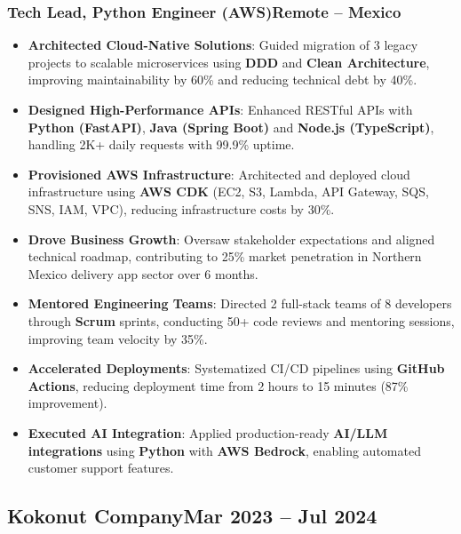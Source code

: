 \documentclass[a4paper,10pt]{article}
\newcommand{\kw}[1]{\textbf{\textcolor{keyword}{#1}}}
\newcommand{\tech}[1]{\textbf{\textcolor{tech}{#1}}}
\begin{document}
\subsubsection*{\small Tech Lead, Python Engineer (AWS)\hfill Remote -- Mexico}
\begin{itemize}[noitemsep, leftmargin=*]
    \item \textbf{Architected Cloud-Native Solutions}: Guided migration of 3 legacy projects to scalable microservices using \kw{DDD} and \kw{Clean Architecture}, improving maintainability by 60\% and reducing technical debt by 40\%.
    \item \textbf{Designed High-Performance APIs}: Enhanced RESTful APIs with \tech{Python (FastAPI)}, \tech{Java (Spring Boot)} and \tech{Node.js (TypeScript)}, handling 2K+ daily requests with 99.9\% uptime.
    \item \textbf{Provisioned AWS Infrastructure}: Architected and deployed cloud infrastructure using \tech{AWS CDK} (EC2, S3, Lambda, API Gateway, SQS, SNS, IAM, VPC), reducing infrastructure costs by 30\%.
    \item \textbf{Drove Business Growth}: Oversaw stakeholder expectations and aligned technical roadmap, contributing to 25\% market penetration in Northern Mexico delivery app sector over 6 months.
    \item \textbf{Mentored Engineering Teams}: Directed 2 full-stack teams of 8 developers through \kw{Scrum} sprints, conducting 50+ code reviews and mentoring sessions, improving team velocity by 35\%.
    \item \textbf{Accelerated Deployments}: Systematized CI/CD pipelines using \tech{GitHub Actions}, reducing deployment time from 2 hours to 15 minutes (87\% improvement).
    \item \textbf{Executed AI Integration}: Applied production-ready \kw{AI/LLM integrations} using \tech{Python} with \tech{AWS Bedrock}, enabling automated customer support features.
\end{itemize}

\subsection*{\small Kokonut Company\hfill\textbf{Mar 2023 -- Jul 2024}}
\end{document}
